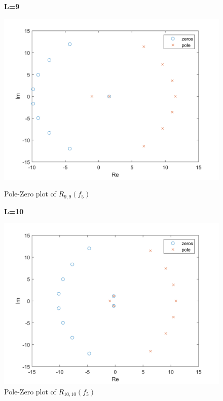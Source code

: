 \documentclass[10pt]{article}
\begin{document}
\begin{figure}[H]
    \begin{minipage}[b]{0.47\linewidth}
            \centering
            \textbf{L=9}\par
            \includegraphics[width=\textwidth]{Files/q5,f5,9.png}
            \caption{Pole-Zero plot of $R_{9,9}(f_5)$}
        \end{minipage}
        \hfill
            \begin{minipage}[b]{0.47\linewidth}
            \centering
    \textbf{L=10}\par
    \includegraphics[width=\textwidth]{Files/q5,f5,10.png}
    \caption{Pole-Zero plot of $R_{10,10}(f_5)$}
        \end{minipage}
\end{figure}
\end{document}
